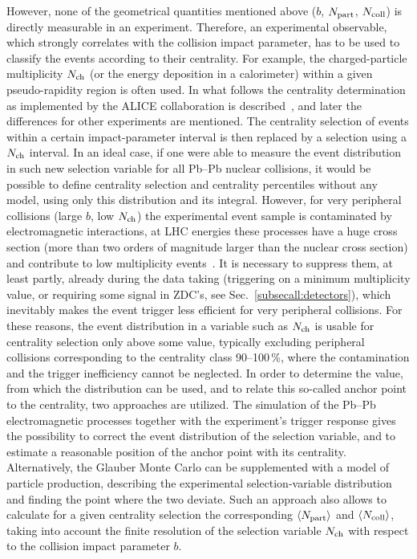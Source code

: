 However, none of the geometrical quantities mentioned above ($b$, $N_{\rm part}$, $N_{\rm coll}$) is directly measurable in an experiment. Therefore, an experimental observable, which strongly correlates with the collision impact parameter, has to be used to classify the events according to their centrality. For example, the charged-particle multiplicity $N_{\rm ch}$ (or the energy deposition in a calorimeter) within a given pseudo-rapidity region is often used. In what follows the centrality determination as implemented by the ALICE collaboration is described~\cite{Abelev:2013qoq}, and later the differences for other experiments are mentioned. The centrality selection of events within a certain impact-parameter interval is then replaced by a selection using a $N_{\rm ch}$ interval. In an ideal case, if one were able to measure the event distribution in such new selection variable for all Pb--Pb nuclear collisions, it would be possible to define centrality selection and centrality percentiles without any model, using only this distribution and its integral. However, for very peripheral collisions (large $b$, low $N_{\rm ch}$) the experimental event sample is contaminated by electromagnetic interactions, at LHC energies these processes have  a huge cross section (more than two orders of magnitude larger than the nuclear cross section) and contribute to low multiplicity events~\cite{Bruce:2009bg,ALICE:2012aa}. It is necessary to suppress them, at least partly, already during the data taking (triggering on a minimum multiplicity value, or requiring some signal in ZDC's, see Sec.~\ref{subsecall:detectors}), which inevitably makes the event trigger less efficient for very peripheral collisions. For these reasons, the event distribution in a variable such as $N_{\rm ch}$ is usable for centrality selection only above some value, typically excluding peripheral collisions corresponding to the centrality class 90--100\,\%, where the contamination and the trigger inefficiency cannot be neglected. In order to determine the value, from which the distribution can be used, and to relate this so-called anchor point to the centrality, two approaches are utilized. The simulation of the Pb--Pb electromagnetic processes together with the experiment's trigger response gives the possibility to correct the event distribution of the selection variable, and to estimate a reasonable position of the anchor point with its centrality. Alternatively, the Glauber Monte Carlo can be supplemented with a model of particle production, describing the experimental selection-variable distribution and finding the point where the two deviate. Such an approach also allows to calculate for a given centrality selection the corresponding $\langle N_{\rm part} \rangle$ and $\langle N_{\rm coll} \rangle$, taking into account the finite resolution of the selection variable $N_{\rm ch}$ with respect to the collision impact parameter $b$.

